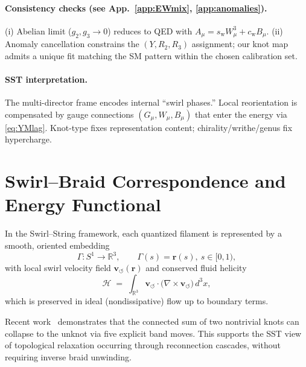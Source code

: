 \documentclass[10pt,reprint,aps,onecolumn,nofootinbib]{revtex4-2}
\begin{document}
    \paragraph{Consistency checks (see App.~\ref{app:EWmix}, \ref{app:anomalies}).}
    (i) Abelian limit ($g_2,g_3\!\to\!0$) reduces to QED with $A_\mu=s_\mathrm{w} W_\mu^3 + c_\mathrm{w} B_\mu$.
        (ii) Anomaly cancellation constrains the $(Y, R_2, R_3)$ assignment; our knot map admits a unique fit matching the SM pattern within the chosen calibration set.

    \paragraph{SST interpretation.}
        The multi-director frame encodes internal “swirl phases.” Local reorientation is compensated by gauge connections $(G_\mu,W_\mu,B_\mu)$ that enter the energy via \eqref{eq:YMlag}. Knot-type fixes representation content; chirality/writhe/genus fix hypercharge.



    \section{Swirl–Braid Correspondence and Energy Functional}\label{sec:swirlbraid}

        In the Swirl–String framework, each quantized filament is represented by a smooth, oriented embedding
        \[
            \Gamma: S^1 \to \mathbb{R}^3,\qquad \Gamma(s)=\mathbf{r}(s),\ s\in[0,1),
        \]
        with local swirl velocity field \(\mathbf{v}_{\!\boldsymbol{\circlearrowleft}}(\mathbf{r})\) and conserved fluid helicity
        \[
            \mathcal{H} \;=\; \int_{\mathbb{R}^3} \mathbf{v}_{\!\boldsymbol{\circlearrowleft}}\cdot
            \big(\nabla\times \mathbf{v}_{\!\boldsymbol{\circlearrowleft}}\big)\,d^3x,
        \]
        which is preserved in ideal (nondissipative) flow up to boundary terms.

        Recent work~\cite{PutyraTurner2024} demonstrates that the connected sum of two nontrivial knots can collapse to the unknot via five explicit band moves. This supports the SST view of topological relaxation occurring through reconnection cascades, without requiring inverse braid unwinding.
\end{document}
